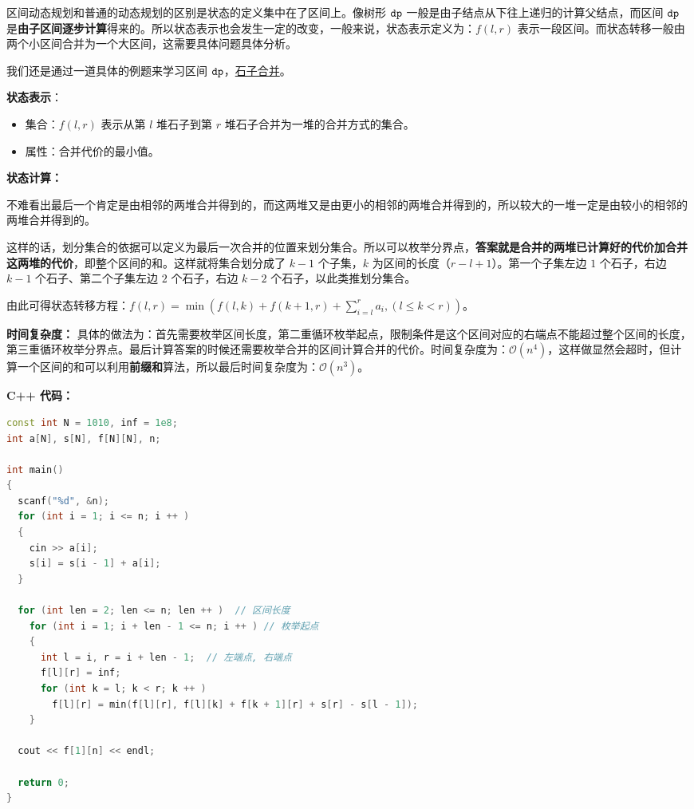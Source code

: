 
区间动态规划和普通的动态规划的区别是状态的定义集中在了区间上。像树形 $\tt dp$ 一般是由子结点从下往上递归的计算父结点，而区间 $\tt dp$ 是\textbf{由子区间逐步计算}得来的。所以状态表示也会发生一定的改变，一般来说，状态表示定义为：$f(l, r)$ 表示一段区间。而状态转移一般由两个小区间合并为一个大区间，这需要具体问题具体分析。

我们还是通过一道具体的例题来学习区间 $\tt dp$，\href{https://www.luogu.com.cn/problem/P1775}{石子合并}。

\textbf{状态表示}：
\begin{itemize}
\item 集合：$f(l, r)$ 表示从第 $l$ 堆石子到第 $r$ 堆石子合并为一堆的合并方式的集合。
\item 属性：合并代价的最小值。
\end{itemize}

\textbf{状态计算：}

不难看出最后一个肯定是由相邻的两堆合并得到的，而这两堆又是由更小的相邻的两堆合并得到的，所以较大的一堆一定是由较小的相邻的两堆合并得到的。

这样的话，划分集合的依据可以定义为最后一次合并的位置来划分集合。所以可以枚举分界点，\textbf{答案就是合并的两堆已计算好的代价加合并这两堆的代价}，即整个区间的和。这样就将集合划分成了 $k - 1$ 个子集，$k$ 为区间的长度（$r - l + 1$）。第一个子集左边 $1$ 个石子，右边 $k - 1$ 个石子、第二个子集左边 $2$ 个石子，右边 $k - 2$ 个石子，以此类推划分集合。

由此可得状态转移方程：$f(l, r) = \min(f(l, k) + f(k + 1, r) + \sum^{r}_{i = l}a_i, (l \leq k < r))$。

\textbf{时间复杂度：} 具体的做法为：首先需要枚举区间长度，第二重循环枚举起点，限制条件是这个区间对应的右端点不能超过整个区间的长度，第三重循环枚举分界点。最后计算答案的时候还需要枚举合并的区间计算合并的代价。时间复杂度为：$\mathcal{O}(n^4)$，这样做显然会超时，但计算一个区间的和可以利用\textbf{前缀和}算法，所以最后时间复杂度为：$\mathcal{O}(n^3)$。

\textbf{C++ 代码：}

\begin{lstlisting}[language=cpp]
const int N = 1010, inf = 1e8;
int a[N], s[N], f[N][N], n;

int main()
{
  scanf("%d", &n);
  for (int i = 1; i <= n; i ++ ) 
  {
    cin >> a[i];
    s[i] = s[i - 1] + a[i];
  }

  for (int len = 2; len <= n; len ++ )  // 区间长度
    for (int i = 1; i + len - 1 <= n; i ++ ) // 枚举起点
    {
      int l = i, r = i + len - 1;  // 左端点, 右端点
      f[l][r] = inf;
      for (int k = l; k < r; k ++ )
        f[l][r] = min(f[l][r], f[l][k] + f[k + 1][r] + s[r] - s[l - 1]);  
    }

  cout << f[1][n] << endl;

  return 0;
}
\end{lstlisting}